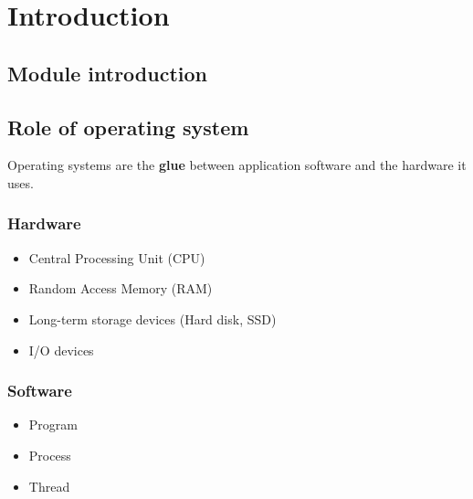 \chapter{Introduction}
\label{ch:intro}


\section{Module introduction}
\label{sec:module-introduction}

\section{Role of operating system}
\label{sec:role-of-operating-system}

Operating systems are the \textbf{glue} between application software and
the hardware it uses.

\subsection{Hardware}
\label{sec:hardware}

\begin{itemize}

\item
  Central Processing Unit (CPU)
\item
  Random Access Memory (RAM)
\item
  Long-term storage devices (Hard disk, SSD)
\item
  I/O devices
\end{itemize}


\subsection{Software}
\label{sec:software}

\begin{itemize}

\item
  Program
\item
  Process
\item
  Thread
\end{itemize}


